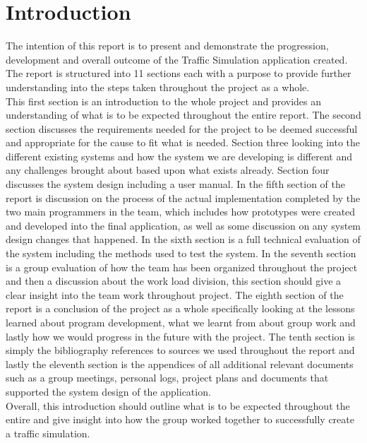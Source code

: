 \documentclass[11pt]{article}
\begin{document}
	\section{Introduction} %
	The intention of this report is to present and demonstrate the progression, development and overall outcome of the Traffic Simulation application created. The report is structured into 11 sections each with a purpose to provide further understanding into the steps taken throughout the project as a whole. 
	\\ This first section is an introduction to the whole project and provides an understanding of what is to be expected throughout the entire report. The second section discusses the requirements needed for the project to be deemed successful and appropriate for the cause to fit what is needed. Section three looking into the different existing systems and how the system we are developing is different and any challenges brought about based upon what exists already. Section four discusses the system design including a user manual. In the fifth section of the report is discussion on the process of the actual implementation completed by the two main programmers in the team, which includes how prototypes were created and developed into the final application, as well as some discussion on any system design changes that happened. In the sixth section is a full technical evaluation of the system including the methods used to test the system. In the seventh section is a group evaluation of how the team has been organized throughout the project and then a discussion about the work load division, this section should give a clear insight into the team work throughout project. The eighth section of the report is a conclusion of the project as a whole specifically looking at the lessons learned about program development, what we learnt from about group work and lastly how we would progress in the future with the project. The tenth section is simply the bibliography references to sources we used throughout the report and lastly the eleventh section is the appendices of all additional relevant documents such as a group meetings, personal logs, project plans and documents that supported the system design of the application.\\
	
	Overall, this introduction should outline what is to be expected throughout the entire and give insight into how the group worked together to successfully create a traffic simulation.
	
\end{document}
